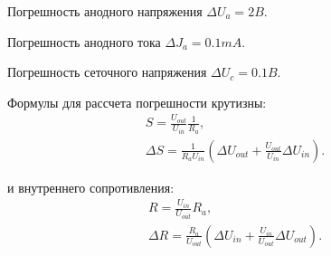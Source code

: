 Погрешность анодного напряжения $\Delta U_a = 2 B$.

Погрешность анодного тока $\Delta J_a = 0.1 mA$.

Погрешность сеточного напряжения $\Delta U_c = 0.1 B$.

Формулы для рассчета погрешности крутизны:
\begin{gather*}
	S=\frac{U_{out}}{U_{in}} \frac{1}{R_a}, \\
	\Delta S=  \frac{1}{R_a U_{in}}(\Delta U_{out}+\frac{U_{out}}{U_{in}}\Delta U_{in}). 
\end{gather*}

и внутреннего сопротивления:
\begin{gather*}
	R=\frac{U_{in}}{U_{out}} R_a, \\
	\Delta R=  \frac{R_a}{U_{out}}(\Delta U_{in}+\frac{U_{in}}{U_{out}}\Delta U_{out}). 
\end{gather*}


